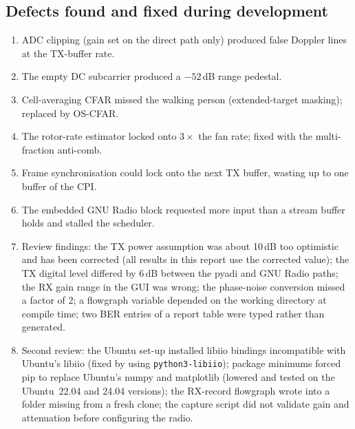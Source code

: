 \documentclass[10pt,a4paper]{article}
\newcommand{\code}[1]{\texttt{#1}}
\begin{document}
\subsection{Defects found and fixed during development}
\begin{enumerate}
\item ADC clipping (gain set on the direct path only) produced false Doppler lines at the TX-buffer rate.
\item The empty DC subcarrier produced a $-52$\,dB range pedestal.
\item Cell-averaging CFAR missed the walking person (extended-target masking); replaced by OS-CFAR.
\item The rotor-rate estimator locked onto $3\times$ the fan rate; fixed with the multi-fraction anti-comb.
\item Frame synchronisation could lock onto the next TX buffer, wasting up to one buffer of the CPI.
\item The embedded GNU Radio block requested more input than a stream buffer holds and stalled the scheduler.
\item Review findings: the TX power assumption was about 10\,dB too optimistic and has been corrected (all results
in this report use the corrected value); the TX digital level differed by 6\,dB between the pyadi and GNU Radio paths;
the RX gain range in the GUI was wrong; the phase-noise conversion missed a factor of 2; a flowgraph variable depended
on the working directory at compile time; two BER entries of a report table were typed rather than generated.
\item Second review: the Ubuntu set-up installed libiio bindings incompatible with Ubuntu's libiio (fixed by using
\code{python3-libiio}); package minimums forced pip to replace Ubuntu's numpy and matplotlib (lowered and tested on
the Ubuntu~22.04 and 24.04 versions); the RX-record flowgraph wrote into a folder missing from a fresh clone; the capture
script did not validate gain and attenuation before configuring the radio.
\end{enumerate}

\end{document}
